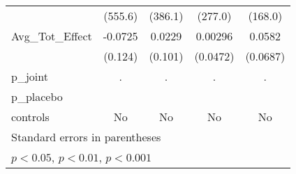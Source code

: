 {\begin{tabular}{l*{4}{c}}
            &     (555.6)         &     (386.1)         &     (277.0)         &     (168.0)         \\
\addlinespace
Avg\_Tot\_Effect&     -0.0725         &      0.0229         &     0.00296         &      0.0582         \\
            &     (0.124)         &     (0.101)         &    (0.0472)         &    (0.0687)         \\
\midrule
p\_joint     &           .         &           .         &           .         &           .         \\
p\_placebo   &                     &                     &                     &                     \\
controls    &          No         &          No         &          No         &          No         \\
\bottomrule
\multicolumn{5}{l}{\footnotesize Standard errors in parentheses}\\
\multicolumn{5}{l}{\footnotesize \sym{*} \(p<0.05\), \sym{**} \(p<0.01\), \sym{***} \(p<0.001\)}\\
\end{tabular}
}

